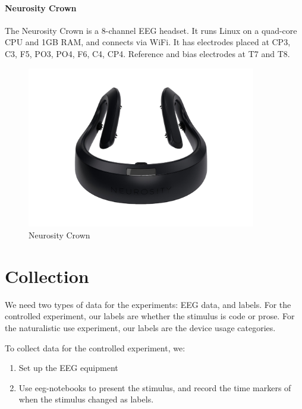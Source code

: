     \begin{minipage}{\textwidth}
        \paragraph*{Neurosity Crown}
        The Neurosity Crown is a 8-channel EEG headset. It runs Linux on a quad-core CPU and 1GB RAM, and connects via WiFi. It has electrodes placed at CP3, C3, F5, PO3, PO4, F6, C4, CP4. Reference and bias electrodes at T7 and T8.

        \begin{figure}[H]
            \centering
            \includegraphics[trim=0 100 0 100,clip,width=100mm]{img/crown-1.png}
            \caption{Neurosity Crown}\label{fig:crown}
        \end{figure}
    \end{minipage}

\pagebreak
\section{Collection}

We need two types of data for the experiments: EEG data, and labels. For the controlled experiment, our labels are whether the stimulus is code or prose. For the naturalistic use experiment, our labels are the device usage categories.

To collect data for the controlled experiment, we:

\begin{enumerate}
    \item Set up the EEG equipment
    \item Use eeg-notebooks to present the stimulus, and record the time markers of when the stimulus changed as labels.
\end{enumerate}

